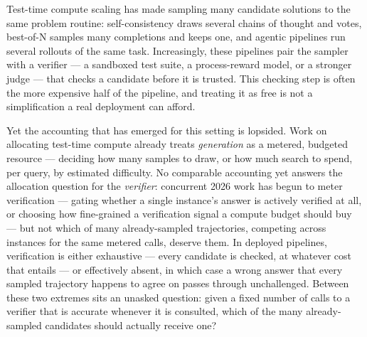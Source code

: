 \documentclass[11pt]{article}
\begin{document}
Test-time compute scaling has made sampling many candidate solutions to the same problem routine: self-consistency draws several chains of thought and votes, best-of-N samples many completions and keeps one, and agentic pipelines run several rollouts of the same task. Increasingly, these pipelines pair the sampler with a verifier --- a sandboxed test suite, a process-reward model, or a stronger judge --- that checks a candidate before it is trusted. This checking step is often the more expensive half of the pipeline, and treating it as free is not a simplification a real deployment can afford.

Yet the accounting that has emerged for this setting is lopsided. Work on allocating test-time compute already treats \emph{generation} as a metered, budgeted resource --- deciding how many samples to draw, or how much search to spend, per query, by estimated difficulty. No comparable accounting yet answers the allocation question for the \emph{verifier}: concurrent 2026 work has begun to meter verification --- gating whether a single instance's answer is actively verified at all, or choosing how fine-grained a verification signal a compute budget should buy --- but not which of many already-sampled trajectories, competing across instances for the same metered calls, deserve them. In deployed pipelines, verification is either exhaustive --- every candidate is checked, at whatever cost that entails --- or effectively absent, in which case a wrong answer that every sampled trajectory happens to agree on passes through unchallenged. Between these two extremes sits an unasked question: given a fixed number of calls to a verifier that is accurate whenever it is consulted, which of the many already-sampled candidates should actually receive one?
\end{document}
